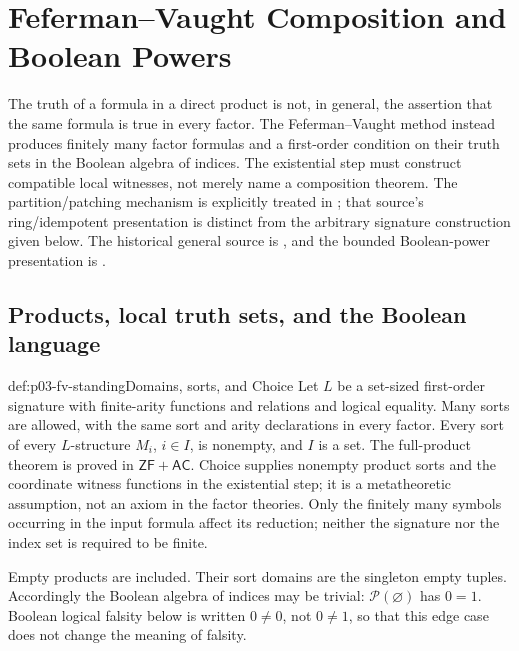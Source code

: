 \chapter{Feferman--Vaught Composition and Boolean Powers}
\label{sec:p03-feferman-vaught-boolean-powers}

The truth of a formula in a direct product is not, in general, the assertion
that the same formula is true in every factor. The Feferman--Vaught method
instead produces finitely many factor formulas and a first-order condition
on their truth sets in the Boolean algebra of indices. The existential step
must construct compatible local witnesses, not merely name a composition
theorem. The partition/patching mechanism is explicitly treated in
\cite[\S2.5, Lemma~2.9 and Theorem~2.10]{DaquinoMacintyre2023FVPreprint};
that source's ring/idempotent presentation is distinct from the arbitrary
signature construction given below. The historical general source is
\textcite{FefermanVaught1959}, and the bounded Boolean-power presentation is
\cite[IV\S5]{BurrisSankappanavar2012}.

\section{Products, local truth sets, and the Boolean language}

\begin{hbconvention}{def:p03-fv-standing}{Domains, sorts, and Choice}
Let \(L\) be a set-sized first-order signature with finite-arity functions
and relations and logical equality. Many sorts are allowed, with the same
sort and arity declarations in every factor. Every sort of every
\(L\)-structure \(M_i\), \(i\in I\), is nonempty, and \(I\) is a set.
The full-product theorem is proved in \(\mathsf{ZF}+\mathsf{AC}\).
Choice supplies nonempty product sorts and the coordinate witness functions
in the existential step; it is a metatheoretic assumption, not an axiom in
the factor theories. Only the finitely many symbols occurring in the input
formula affect its reduction; neither the signature nor the index set is
required to be finite.

Empty products are included. Their sort domains are the singleton empty
tuples. Accordingly the Boolean algebra of indices may be trivial:
\(\mathcal P(\varnothing)\) has \(0=1\). Boolean logical falsity below
is written \(0\ne0\), not \(0\ne1\), so that this edge case does not
change the meaning of falsity.
\end{hbconvention}

